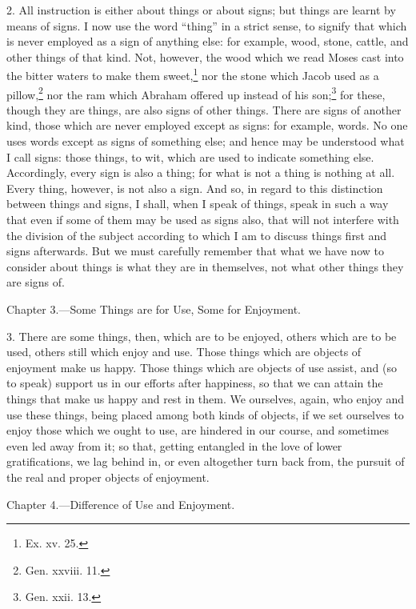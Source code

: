 2. All instruction is either about things or about signs; but things are learnt by means of signs. I now use the word “thing” in a strict sense, to signify that which is never employed as a sign of anything else: for example, wood, stone, cattle, and other things of that kind. Not, however, the wood which we read Moses cast into the bitter waters to make them sweet,\footnote{Ex. xv. 25.} nor the stone which Jacob used as a pillow,\footnote{Gen. xxviii. 11.} nor the ram which Abraham offered up instead of his son;\footnote{Gen. xxii. 13.} for these, though they are things, are also signs of other things. There are signs of another kind, those which are never employed except as signs: for example, words. No one uses words except as signs of something else; and hence may be understood what I call signs: those things, to wit, which are used to indicate something else. Accordingly, every sign is also a thing; for what is not a thing is nothing at all. Every thing, however, is not also a sign. And so, in regard to this distinction between things and signs, I shall, when I speak of things, speak in such a way that even if some of them may be used as signs also, that will not interfere with the division of the subject according to which I am to discuss things first and signs afterwards. But we must carefully remember that what we have now to consider about things is what they are in themselves, not what other things they are signs of.


Chapter 3.—Some Things are for Use, Some for Enjoyment.

3. There are some things, then, which are to be enjoyed, others which are to be used, others still which enjoy and use. Those things which are objects of enjoyment make us happy. Those things which are objects of use assist, and (so to speak) support us in our efforts after happiness, so that we can attain the things that make us happy and rest in them. We ourselves, again, who enjoy and use these things, being placed among both kinds of objects, if we set ourselves to enjoy those which we ought to use, are hindered in our course, and sometimes even led away from it; so that, getting entangled in the love of lower gratifications, we lag behind in, or even altogether turn back from, the pursuit of the real and proper objects of enjoyment.


Chapter 4.—Difference of Use and Enjoyment.

